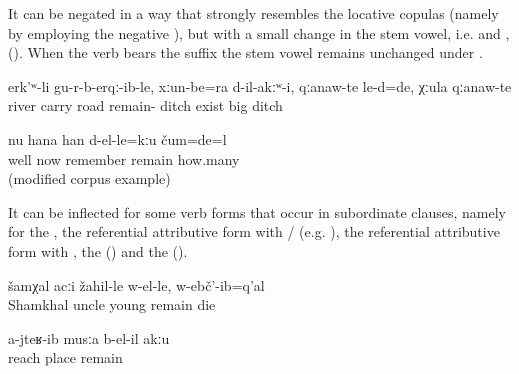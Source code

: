 It can be negated in a way that strongly resembles the locative copulas (namely by employing the negative ), but with a small change in the stem vowel, i.e.  and  , (). When the verb  bears the  suffix  the stem vowel remains unchanged under  .
%
\begin{exe}
	\ex	\label{ex:The river carried them away, roads had not remained, and big ditches were there}
	\gll	erk'ʷ-li	gu-r-b-erqː-ib-le,	xːun-be=ra	d-il-akːʷ-i,	qːanaw-te	le-d=de,		χːula	qːanaw-te\\
		river	carry	road	remain-		ditch	exist		big	ditch\\
	\glt	{}

	\ex	\label{ex:Now I don't remember how many (rubles) it was. (modified example)}
	\gll	nu	hana	han	d-el-le=kːu	čum=de=l\\
		well	now	remember	remain	how.many\\
	\glt	{} (modified corpus example)
\end{exe}

It can be inflected for some verb forms that occur in subordinate clauses, namely for the  , the referential attributive form with \slash{} (e.g. ), the referential attributive form with  , the   () and the  ().
%
\begin{exe}
	\ex	\label{ex:Uncle Shamkhal died when he was young}
	\gll	šamχal	acːi	žahil-le	w-el-le,	w-ebč'-ib=q'al\\
		Shamkhal	uncle	young	remain	die\\
	\glt	{}

	\ex	\label{ex:No place is left where I (masc.) did not go}
	\gll	a-jteʁ-ib	musːa	b-el-il	akːu\\
		reach	place	remain	\\
	\glt	{}
\end{exe}

